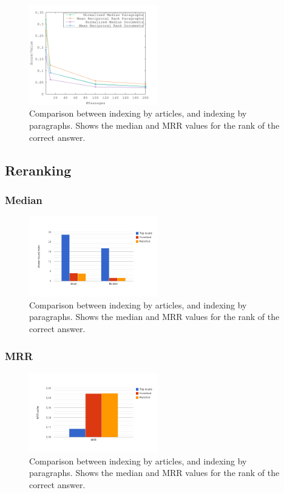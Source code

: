 \begin{figure}[h!]
  \centering
  \includegraphics[width=0.5\textwidth]{figures/median.pdf}
  \caption{Comparison between indexing by articles, and indexing by paragraphs. 
  Shows the median and MRR values for the rank of the correct answer.}
\end{figure}

\subsection{Reranking}

\subsubsection{Median}


\begin{figure}[h!]
  \centering
  \includegraphics[width=0.5\textwidth]{figures/meanMedian.png}
  \caption{Comparison between indexing by articles, and indexing by paragraphs. 
  Shows the median and MRR values for the rank of the correct answer.}
\end{figure}

\subsubsection{MRR}


\begin{figure}[h!]
  \centering
  \includegraphics[width=0.5\textwidth]{figures/mrr.png}
  \caption{Comparison between indexing by articles, and indexing by paragraphs. 
  Shows the median and MRR values for the rank of the correct answer.}
\end{figure}
